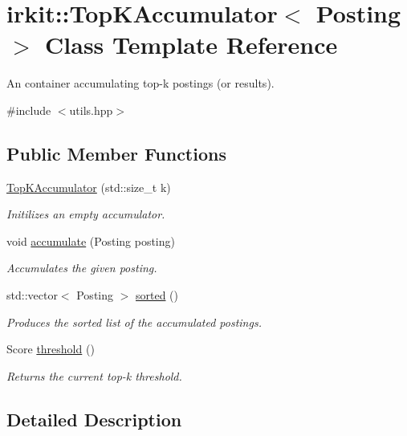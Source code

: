 \hypertarget{classirkit_1_1TopKAccumulator}{}\section{irkit\+:\+:Top\+K\+Accumulator$<$ Posting $>$ Class Template Reference}
\label{classirkit_1_1TopKAccumulator}


An container accumulating top-\/k postings (or results).  




{\ttfamily \#include $<$utils.\+hpp$>$}

\subsection*{Public Member Functions}
\begin{DoxyCompactItemize}
\item 
\mbox{\hyperlink{classirkit_1_1TopKAccumulator_a74e1ee880b5d081bc0a3ba0e7fcdb1e3}{Top\+K\+Accumulator}} (std\+::size\+\_\+t k)
\begin{DoxyCompactList}\small\item\em Initilizes an empty accumulator. \end{DoxyCompactList}\item 
void \mbox{\hyperlink{classirkit_1_1TopKAccumulator_a6caae6de2f8f555b4ad728d8819d1633}{accumulate}} (Posting posting)
\begin{DoxyCompactList}\small\item\em Accumulates the given posting. \end{DoxyCompactList}\item 
std\+::vector$<$ Posting $>$ \mbox{\hyperlink{classirkit_1_1TopKAccumulator_adde0cfe7ba7dc26ca2cc55422b2351fa}{sorted}} ()
\begin{DoxyCompactList}\small\item\em Produces the sorted list of the accumulated postings. \end{DoxyCompactList}\item 
Score \mbox{\hyperlink{classirkit_1_1TopKAccumulator_abe812895292f04ad6cdcebe3f0864d30}{threshold}} ()
\begin{DoxyCompactList}\small\item\em Returns the current top-\/k threshold. \end{DoxyCompactList}\end{DoxyCompactItemize}


\subsection{Detailed Description}
